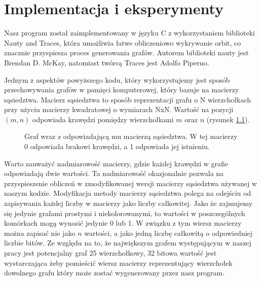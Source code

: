 \chapter{Implementacja i eksperymenty}
Nasz program został zaimplementowany w języku C z wykorzystaniem biblioteki Nauty and Traces\cite{nauty}, która umożliwia łatwe obliczeniowo wykrywanie orbit, co znacznie przyspiesza proces generowania grafów. 
Autorem biblioteki nauty jest Brendan D. McKay, natomiast twórcą Traces jest Adolfo Piperno.

Jednym z aspektów powyższego kodu, który wykorzystujemy jest sposób przechowywania grafów w pamięci komputerowej, który bazuje na macierzy sąsiedztwa. Macierz sąsiedztwa to sposób reprezentacji grafu o N wierzchołkach przy użyciu macierzy kwadratowej o wymiarach NxN. Wartość na pozycji $(m, n)$ odpowiada  krawędzi pomiędzy wierzchołkami $m$ oraz $n$ (rysunek \ref{exmatrix}).
\begin{figure}[H]
  \centering
  \hfill
  \hfill
  \hfill
  \hfill
  \caption{Graf wraz z odpowiadającą mu macierzą sąsiedztwa. W tej macierzy 0 odpowiada brakowi krawędzi, a 1 odpowiada jej istnieniu.}
  \label{exmatrix}
\end{figure}

Warto zauważyć nadmiarowość macierzy, gdzie każdej krawędzi w grafie odpowiadają dwie wartości. Ta nadmiarowość okazjonalnie pozwala na przyspieszenie obliczeń w zmodyfikowanej wersji macierzy sąsiedztwa używanej w naszym kodzie.
Modyfikacja metody macierzy sąsiedztwa polega na odejściu od zapisywania każdej liczby w macierzy jako liczby całkowitej. Jako że zajmujemy się jedynie grafami prostymi i niekolorowanymi, to wartości w poszczególnych komórkach mogą wynosić jedynie 0 lub 1. W związku z tym wiersz macierzy można zapisać nie jako $n$ wartości, a jako jedną liczbę całkowitą o odpowiedniej liczbie bitów. Ze względu na to, że największym grafem występującym w naszej pracy jest potencjalny graf 25 wierzchołkowy, 32 bitowa wartość jest wystarczająca żeby pomieścić wiersz macierzy reprezentujący wierzchołek dowolnego grafu który może zostać wygenerowany przez nasz program. 